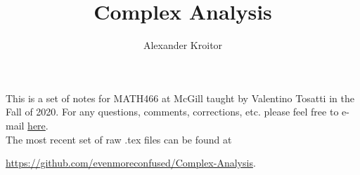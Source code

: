 \documentclass{notes}
\begin{document}
\author{Alexander Kroitor}

\begin{titlepage}
    \title{Complex Analysis}
    \maketitle
\end{titlepage}



\setcounter{lecnum}{0}
\setcounter{page}{1}
\tableofcontents

\newpage

\begin{note}
This is a set of notes for MATH466 at McGill taught by Valentino Tosatti in the Fall of 2020. For any questions, comments, corrections, etc. please feel free to e-mail \href{mailto:alexander.kroitor@mail.mcgill.ca}{here}.\\
 
The most recent set of raw .tex files can be found at
\begin{center}
    \url{https://github.com/evenmoreconfused/Complex-Analysis}.
\end{center}
\end{note}





% 
% 
% 
% 
% 
% 
% 
%  
% 
% 
% 
% 
% 
% 
% 
% 
% 
% 
% 
% 
% 
% 

% 
% 
% 
\end{document}
